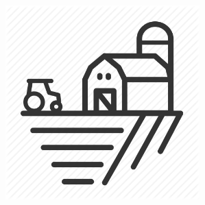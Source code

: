 \documentclass{article}
\begin{document}
\begin{center}
    \includegraphics[width=75mm]{field.jpg}
\end{center}

\newcommand{\AASprTab}[5]{


\begin{center}
\begin{tabular}{ p{0.06\textwidth} p{0.2\textwidth} p{0.2\textwidth} p{0.2\textwidth} p{0.2\textwidth} p{0.2\textwidth} }

  &   &   &   &   \\
\hline
\multicolumn{6}{|c|}{}\\[-1ex]
\multicolumn{6}{|c|}{{\LARGE Optymalizacja niewielkiego gospodarstwa rolnego}} \\
\multicolumn{6}{|c|}{}\\[-1ex]



\hline
\multicolumn{2}{|l|}{\AASprTabFieldDsc{Wydział}} & \multicolumn{2}{|l|}{\AASprTabFieldDsc{Kierunek}} & \multicolumn{2}{|l|}{\AASprTabFieldDsc{Rok}} \\
\multicolumn{2}{|c|}{\AASprTabFieldVar{EAIiIB}} & \multicolumn{2}{|c|}{\AASprTabFieldVar{Automatyka i Robotyka}} & \multicolumn{2}{|c|}{\AASprTabFieldVar{III}} \\



\hline
\multicolumn{1}{|c|}{\tiny{ }} &
\multicolumn{5}{|c|}{\tiny{ }} \\
\multicolumn{1}{|c|}{\AASprTabFieldDscH{L.p.}} &
\multicolumn{5}{|l|}{\AASprTabFieldDscH{Skład grupy ćwiczeniowej}}\\

\hline
\multicolumn{1}{|c|}{1} &
\multicolumn{5}{|l|}{\AASprTabFieldVar{#3}}\\

\hline
\multicolumn{1}{|c|}{2} &
\multicolumn{5}{|l|}{\AASprTabFieldVar{#4}}\\

\hline
\multicolumn{1}{|c|}{3} &
\multicolumn{5}{|l|}{\AASprTabFieldVar{#5}}\\

\hline
\end{tabular}
\end{center}
}
\end{document}
